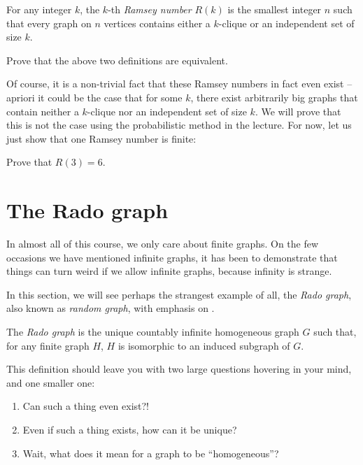 \documentclass[nobib]{tufte-handout}
\begin{document}
\begin{definition}
    For any integer $k$, the $k$-th \emph{Ramsey number} $R(k)$ is the smallest integer $n$ such that every graph on $n$ vertices contains either a $k$-clique or an independent set of size $k$.
\end{definition}

\begin{xca}
    Prove that the above two definitions are equivalent.
\end{xca}

Of course, it is a non-trivial fact that these Ramsey numbers in fact even exist -- apriori it could be the case that for some $k$, there exist arbitrarily big graphs that contain neither a $k$-clique nor an independent set of size $k$. We will prove that this is not the case using the probabilistic method in the lecture. For now, let us just show that one Ramsey number is finite:

\begin{xca}
    Prove that $R(3) = 6$.
\end{xca}

\section{The Rado graph}

In almost all of this course, we only care about finite graphs. On the few occasions we have mentioned infinite graphs, it has been to demonstrate that things can turn weird if we allow infinite graphs, because infinity is strange.

In this section, we will see perhaps the strangest example of all, the \emph{Rado graph}, also known as  \emph{random graph}, with emphasis on .

\begin{definition}
  The \emph{Rado graph} is the unique countably infinite homogeneous graph $G$ such that, for any finite graph $H$, $H$ is isomorphic to an induced subgraph of $G$.
\end{definition}

This definition should leave you with two large questions hovering in your mind, and one smaller one:
\begin{enumerate}
  \item Can such a thing even exist?!
  \item Even if such a thing exists, how can it be unique?
  \item Wait, what does it mean for a graph to be ``homogeneous''?
\end{enumerate}
\end{document}
